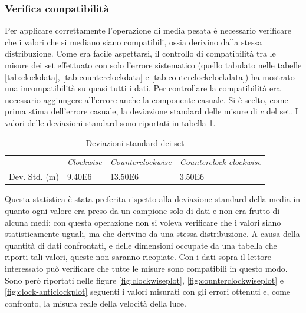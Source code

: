 \documentclass[a4paper,11pt]{article}
\begin{document}
	\subsubsection{Verifica compatibilità} \label{subsubsec:vercomp}
	Per applicare correttamente l'operazione di media pesata è necessario verificare che i valori che si mediano siano compatibili, ossia derivino dalla stessa distribuzione. Come era facile aspettarsi, il controllo di compatibilità tra le misure dei set effettuato con solo l'errore sistematico (quello tabulato nelle tabelle \ref{tab:clockdata}, \ref{tab:counterclockdata} e \ref{tab:couterclockclockdata}) ha mostrato una incompatibilità su quasi tutti i dati. Per controllare la compatibilità era necessario aggiungere all'errore anche la componente casuale. Si è scelto, come prima stima dell'errore casuale, la deviazione standard delle misure di $ c $ del set. I valori delle deviazioni standard sono riportati in tabella \ref{tab:setdevstd}.
	

	\begin{table}[htbp]
		\centering
		\caption{Deviazioni standard dei set}
		\vspace{0.1cm}
		\begin{tabular}{llll}
			\rowcolor[rgb]{ .741,  .843,  .933}       & \emph{Clockwise} & \emph{Counterclockwise} & \emph{Counterclock-clockwise} \\
			\rowcolor[rgb]{ .741,  .843,  .933} Dev. Std. (\si{\meter}) & \cellcolor[rgb]{ .859,  .859,  .859} \num{9.40E6} & \cellcolor[rgb]{ .859,  .859,  .859} \num{13.50E6} & \cellcolor[rgb]{ .859,  .859,  .859} \num{3.50E6} \\
		\end{tabular}%
		\label{tab:setdevstd}%
	\end{table}%
	
	Questa statistica è stata preferita rispetto alla deviazione standard della media in quanto ogni valore era preso da un campione solo di dati e non era frutto di alcuna medi: con questa operazione non si voleva verificare che i valori siano statisticamente uguali, ma che derivino da una stessa distribuzione. A causa della quantità di dati confrontati, e delle dimensioni occupate da una tabella che riporti tali valori, queste non saranno ricopiate. Con i dati sopra il lettore interessato può verificare che tutte le misure sono compatibili in questo modo. Sono però riportati nelle figure \ref{fig:clockwiseplot}, \ref{fig:counterclockwiseplot} e \ref{fig:clock-anticlockplot} seguenti i valori misurati con gli errori ottenuti e, come confronto, la misura reale della velocità della luce.
	
\end{document}
